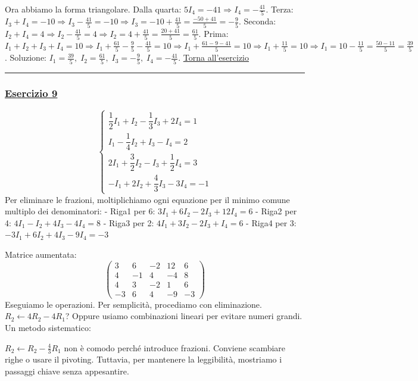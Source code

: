 Ora abbiamo la forma triangolare. Dalla quarta: \(5I_4 = -41 \Rightarrow I_4 = -\frac{41}{5}\).
Terza: \(I_3 + I_4 = -10 \Rightarrow I_3 - \frac{41}{5} = -10 \Rightarrow I_3 = -10 + \frac{41}{5} = \frac{-50+41}{5} = -\frac{9}{5}\).
Seconda: \(I_2 + I_4 = 4 \Rightarrow I_2 - \frac{41}{5} = 4 \Rightarrow I_2 = 4 + \frac{41}{5} = \frac{20+41}{5} = \frac{61}{5}\).
Prima: \(I_1 + I_2 + I_3 + I_4 = 10 \Rightarrow I_1 + \frac{61}{5} - \frac{9}{5} - \frac{41}{5} = 10 \Rightarrow I_1 + \frac{61-9-41}{5} = 10 \Rightarrow I_1 + \frac{11}{5} = 10 \Rightarrow I_1 = 10 - \frac{11}{5} = \frac{50-11}{5} = \frac{39}{5}\).
Soluzione: \(\displaystyle I_1 = \frac{39}{5},\; I_2 = \frac{61}{5},\; I_3 = -\frac{9}{5},\; I_4 = -\frac{41}{5}\). \hfill \hyperlink{ex:8}{Torna all'esercizio}\\
\hrule

\subsubsection*{\hyperref[ex:9]{Esercizio 9}}
\[
\begin{cases}
\dfrac{1}{2}I_1 + I_2 - \dfrac{1}{3}I_3 + 2I_4 = 1 \\[6pt]
I_1 - \dfrac{1}{4}I_2 + I_3 - I_4 = 2 \\[6pt]
2I_1 + \dfrac{3}{2}I_2 - I_3 + \dfrac{1}{2}I_4 = 3 \\[6pt]
- I_1 + 2I_2 + \dfrac{4}{3}I_3 - 3I_4 = -1
\end{cases}
\]
Per eliminare le frazioni, moltiplichiamo ogni equazione per il minimo comune multiplo dei denominatori:
- Riga1 per 6: \(3I_1 + 6I_2 - 2I_3 + 12I_4 = 6\)
- Riga2 per 4: \(4I_1 - I_2 + 4I_3 - 4I_4 = 8\)
- Riga3 per 2: \(4I_1 + 3I_2 - 2I_3 + I_4 = 6\)
- Riga4 per 3: \(-3I_1 + 6I_2 + 4I_3 - 9I_4 = -3\)

Matrice aumentata:
\[
\left(\begin{array}{cccc|c}
3 & 6 & -2 & 12 & 6 \\
4 & -1 & 4 & -4 & 8 \\
4 & 3 & -2 & 1 & 6 \\
-3 & 6 & 4 & -9 & -3
\end{array}\right)
\]
Eseguiamo le operazioni. Per semplicità, procediamo con eliminazione.
\(R_2 \leftarrow 4R_2 - 4R_1\)? Oppure usiamo combinazioni lineari per evitare numeri grandi. Un metodo sistematico:

\(R_2 \leftarrow R_2 - \frac{4}{3}R_1\) non è comodo perché introduce frazioni. Conviene scambiare righe o usare il pivoting. Tuttavia, per mantenere la leggibilità, mostriamo i passaggi chiave senza appesantire.

